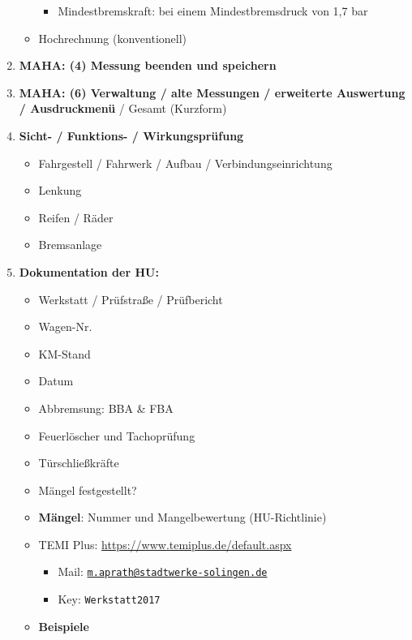 \documentclass{vorlage-design-main}
\begin{document}
\begin{enumerate}
\begin{itemize}
    \begin{itemize}
    
    \item
      Mindestbremskraft: bei einem Mindestbremsdruck von 1,7 bar
    \end{itemize}
  \item
    Hochrechnung (konventionell)
  \end{itemize}
\item
  \textbf{MAHA: (4) Messung beenden und speichern}
\item
  \textbf{MAHA: (6) Verwaltung / alte Messungen / erweiterte Auswertung
  / Ausdruckmenü} / Gesamt (Kurzform)
\item
  \textbf{Sicht- / Funktions- / Wirkungsprüfung}

  \begin{itemize}
  
  \item
    Fahrgestell / Fahrwerk / Aufbau / Verbindungseinrichtung
  \item
    Lenkung
  \item
    Reifen / Räder
  \item
    Bremsanlage
  \end{itemize}
\item
  \textbf{Dokumentation der HU:}

  \begin{itemize}
  
  \item
    Werkstatt / Prüfstraße / Prüfbericht
  \item
    Wagen-Nr.
  \item
    KM-Stand
  \item
    Datum
  \item
    Abbremsung: BBA \& FBA
  \item
    Feuerlöscher und Tachoprüfung
  \item
    Türschließkräfte
  \item
    Mängel festgestellt?
  \item
    \textbf{Mängel}: Nummer und Mangelbewertung (HU-Richtlinie)
  \item
    TEMI Plus: \url{https://www.temiplus.de/default.aspx}

    \begin{itemize}
    
    \item
      Mail:
      \href{mailto:m.aprath@stadtwerke-solingen.de}{\nolinkurl{m.aprath@stadtwerke-solingen.de}}
    \item
      Key: \verb|Werkstatt2017|\\
    \end{itemize}
  \item
    \textbf{Beispiele}


\end{itemize}
\end{enumerate}
\end{document}
